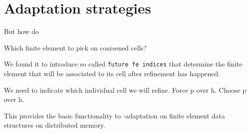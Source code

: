 \section{Adaptation strategies}
\label{sec:adaptation}


But how do

Which finite element to pick on coarsened cells?

We found it to introduce so called \texttt{future fe indices} that determine the finite element that will be associated to its cell after refinement has happened.

We need to indicate which individual cell we will refine. Force p over h. Choose p over h.

This provides the basic functionality to \hp-adaptation on finite element data structures on distributed memory.